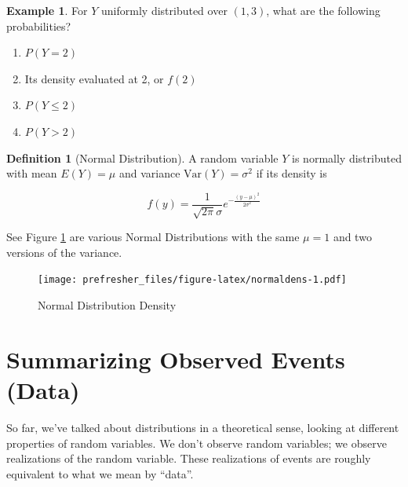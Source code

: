 \documentclass[
]{book}
\providecommand{\tightlist}{%
  \setlength{\itemsep}{0pt}\setlength{\parskip}{0pt}}
\theoremstyle{definition}
\newtheorem{definition}{Definition}[chapter]
\theoremstyle{definition}
\newtheorem{example}{Example}[chapter]
\theoremstyle{definition}
\theoremstyle{remark}
\begin{document}
\begin{example}
\protect\hypertarget{exm:unnamed-chunk-92}{}{\label{exm:unnamed-chunk-92} }For \(Y\) uniformly distributed over \((1,3)\), what are the following probabilities?

\begin{enumerate}
\def\labelenumi{\arabic{enumi}.}
\tightlist
\item
  \(P(Y=2)\)
\item
  Its density evaluated at 2, or \(f(2)\)
\item
  \(P(Y \le 2)\)
\item
  \(P(Y > 2)\)
\end{enumerate}
\end{example}

\begin{definition}[Normal Distribution]
\protect\hypertarget{def:unnamed-chunk-93}{}{\label{def:unnamed-chunk-93} {} }
A random variable \(Y\) is normally distributed with mean \(E(Y)=\mu\) and variance \(\text{Var}(Y)=\sigma^2\) if its density is

\[f(y)=\frac{1}{\sqrt{2\pi}\sigma}e^{-\frac{(y-\mu)^2}{2\sigma^2}}\]
\end{definition}

See Figure \ref{fig:normaldens} are various Normal Distributions with the same \(\mu = 1\) and two versions of the variance.

\begin{figure}
\centering
\texttt{[image: prefresher\_files/figure-latex/normaldens-1.pdf]}
\caption{\label{fig:normaldens}Normal Distribution Density}
\end{figure}

\hypertarget{summarizing-observed-events-data}{%
\section{Summarizing Observed Events (Data)}\label{summarizing-observed-events-data}}

So far, we've talked about distributions in a theoretical sense, looking at different properties of random variables. We don't observe random variables; we observe realizations of the random variable. These realizations of events are roughly equivalent to what we mean by ``data''.
\end{document}
